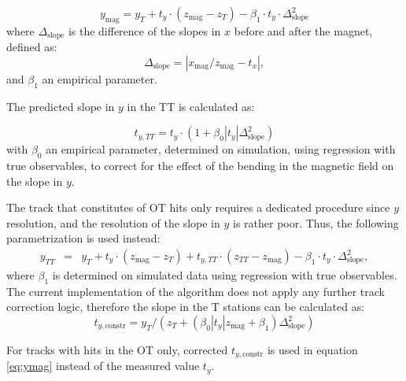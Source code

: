 \begin{equation}
\label{eq:ymag}
y_{\text{mag}} = y_{T} + t_{y} \cdot (z_{\text{mag}} - z_{T}) - \beta_{1} \cdot t_{y} \cdot \Delta_{\text{slope}}^{2}
\end{equation}
where $\Delta_{\text{slope}}$ is the difference of the slopes in $x$ before and after the magnet, defined as: 
\begin{equation}
\Delta_{\text{slope}} = \left| x_{\text{mag}}/z_{\text{mag}} - t_{x} \right|,
\end{equation}
and $\beta_{1}$ an empirical parameter.

The predicted slope in $y$ in the TT is calculated as:

\begin{equation}
t_{y,TT} = t_{y} \cdot (1 + \beta_{0} |t_{y}| \Delta_{\text{slope}}^{2})
\end{equation}
with  $\beta_{0}$ an empirical parameter, determined on simulation, 
using regression with true observables, to correct
for the effect of the bending in the magnetic field on the slope in $y$.


The track that constitutes of OT hits only requires a dedicated procedure since $y$ resolution, and the resolution of the slope in $y$ is rather poor. 
Thus, the following parametrization is used instead:
\begin{eqnarray}
y_{TT} & = & y_{T} + t_{y} \cdot (z_{\text{mag}} - z_{T}) + t_{y,TT} \cdot (z_{TT} - z_{\text{mag}}) - \beta_{1} \cdot t_{y} \cdot \Delta_{\text{slope}}^{2},
\end{eqnarray}
where $\beta_{1}$ is determined on simulated data using regression with true observables. 
The current implementation of the algorithm does not apply any further track correction logic, therefore the slope in the T stations can be calculated as:
\begin{equation}
t_{y, \text{constr}} = y_{T} / ( z_{T} + (\beta_{0} |t_{y}| z_{\text{mag}} + \beta_{1} ) \Delta_{\text{slope}}^{2})
\end{equation}

For tracks with hits in the OT only, corrected $t_{y, \text{constr}}$ is used in equation \ref{eq:ymag} instead of the measured value $t_{y}$.

